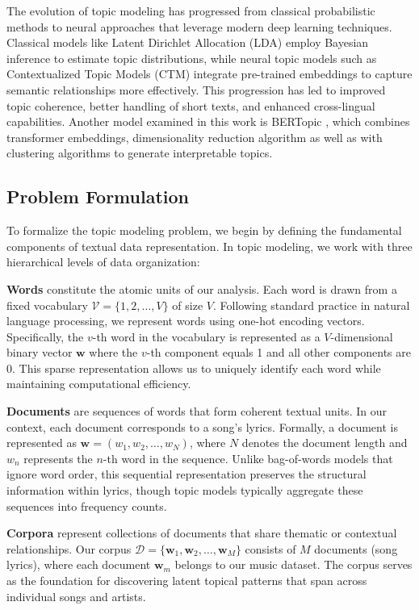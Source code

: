 \documentclass[12pt]{article}
\begin{document}
The evolution of topic modeling has progressed from classical probabilistic
methods to neural approaches that leverage modern deep learning techniques.
Classical models like Latent Dirichlet Allocation (LDA) \cite{blei2003latent}
employ Bayesian inference to estimate topic distributions, while neural topic
models such as Contextualized Topic Models (CTM) \cite{bianchi2021cross}
integrate pre-trained embeddings to capture semantic relationships more
effectively. This progression has led to improved topic coherence, better
handling of short texts, and enhanced cross-lingual capabilities. Another model
examined in this work is BERTopic \cite{grootendorst2022bertopic}, which
combines transformer embeddings, dimensionality reduction algorithm as well as
with clustering algorithms to generate interpretable topics.

\subsection{Problem Formulation}
To formalize the topic modeling problem, we begin by defining the fundamental
components of textual data representation. In topic modeling, we work with
three hierarchical levels of data organization:

\textbf{Words} constitute the atomic units of our analysis. Each word is drawn from a fixed vocabulary $\mathcal{V} = \{1, 2, \ldots, V\}$ of size $V$. Following standard practice in natural language processing, we represent words using one-hot encoding vectors. Specifically, the $v$-th word in the vocabulary is represented as a $V$-dimensional binary vector $\mathbf{w}$ where the $v$-th component equals 1 and all other components are 0. This sparse representation allows us to uniquely identify each word while maintaining computational efficiency.

\textbf{Documents} are sequences of words that form coherent textual units. In our context, each document corresponds to a song's lyrics. Formally, a document is represented as $\mathbf{w} = (w_1, w_2, \ldots, w_N)$, where $N$ denotes the document length and $w_n$ represents the $n$-th word in the sequence. Unlike bag-of-words models that ignore word order, this sequential representation preserves the structural information within lyrics, though topic models typically aggregate these sequences into frequency counts.

\textbf{Corpora} represent collections of documents that share thematic or contextual relationships. Our corpus $\mathcal{D} = \{\mathbf{w}_1, \mathbf{w}_2, \ldots, \mathbf{w}_M\}$ consists of $M$ documents (song lyrics), where each document $\mathbf{w}_m$ belongs to our music dataset. The corpus serves as the foundation for discovering latent topical patterns that span across individual songs and artists.
\end{document}
